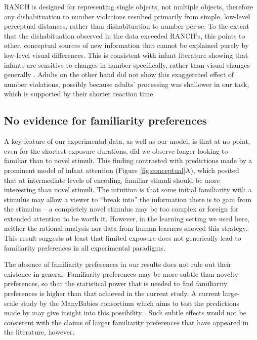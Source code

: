 \documentclass[
]{article}
\begin{document}
RANCH is designed for representing single objects, not multiple objects, therefore any dishabituation to number violations resulted primarily from simple, low-level perceptual distances, rather than dishabituation to number per-se. To the extent that the dishabituation observed in the data exceeded RANCH's, this points to other, conceptual sources of new information that cannot be explained purely by low-level visual differences. This is consistent with infant literature showing that infants are sensitive to changes in number specifically, rather than visual changes generally \autocite{wynn1998psychological,feigenson2004core}. Adults on the other hand did not show this exaggerated effect of number violations, possibly because adults' processing was shallower in our task, which is supported by their shorter reaction time.


\hypertarget{no-evidence-for-familiarity-preferences}{%
\subsection{No evidence for familiarity preferences}\label{no-evidence-for-familiarity-preferences}}

A key feature of our experimental data, as well as our model, is that at no point, even for the shortest exposure durations, did we observe longer looking to familiar than to novel stimuli. This finding contrasted with predictions made by a prominent model of infant attention (Figure \ref{fig:conceptual}A), which posited that at intermediate levels of encoding, familiar stimuli should be more interesting than novel stimuli. The intuition is that some initial familiarity with a stimulus may allow a viewer to ``break into'' the information there is to gain from the stimulus -- a completely novel stimulus may be too complex or foreign for extended attention to be worth it. However, in the learning setting we used here, neither the rational analysis nor data from human learners showed this strategy. This result suggests at least that limited exposure does not generically lead to familiarity preferences in all experimental paradigms.

The absence of familiarity preferences in our results does not rule out their existence in general. Familiarity preferences may be more subtle than novelty preferences, so that the statistical power that is needed to find familiarity preferences is higher than that achieved in the current study. A current large-scale study by the ManyBabies consortium which aims to test the predictions made by \textcite{hunter1988multifactor} may give insight into this possibility \autocite{kosie2023manybabies}. Such subtle effects would not be consistent with the claims of larger familiarity preferences that have appeared in the literature, however. 
\end{document}
